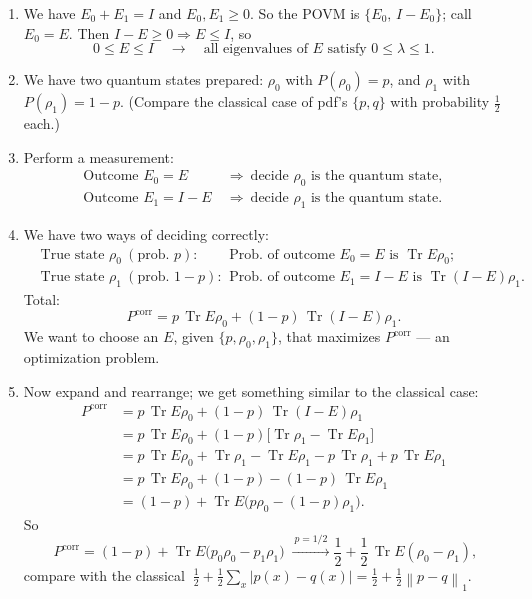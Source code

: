 \documentclass[11pt]{article}
\newcommand{\Tr}{\operatorname{Tr}}
\newcommand{\onenorm}[1]{\left\lVert #1 \right\rVert_{1}}
\begin{document}
\begin{enumerate}[label=\textbf{\arabic*.}, leftmargin=*]
\item We have $E_0+E_1=I$ and $E_0,E_1\ge 0$. So the POVM is $\{E_0,\,I-E_0\}$;
call $E_0=E$. Then $I-E\ge 0 \Rightarrow E\le I$, so
\[
0 \le E \le I \quad\longrightarrow\quad
\text{all eigenvalues of } E \text{ satisfy } 0\le\lambda\le 1.
\]

\item We have two quantum states prepared: $\rho_0$ with $P(\rho_0)=p$, and
$\rho_1$ with $P(\rho_1)=1-p$. (Compare the classical case of pdf's $\{p,q\}$
with probability $\tfrac12$ each.)

\item Perform a measurement:
\[
\begin{aligned}
\text{Outcome } E_0=E \ &\Rightarrow\ \text{decide } \rho_0 \text{ is the quantum state},\\
\text{Outcome } E_1=I-E \ &\Rightarrow\ \text{decide } \rho_1 \text{ is the quantum state}.
\end{aligned}
\]

\item We have two ways of deciding correctly:
\[
\begin{aligned}
&\text{True state } \rho_0 \ (\text{prob. } p):
&&\text{Prob.\ of outcome } E_0=E \text{ is } \Tr E\rho_0;\\
&\text{True state } \rho_1 \ (\text{prob. } 1-p):
&&\text{Prob.\ of outcome } E_1=I-E \text{ is } \Tr(I-E)\rho_1.
\end{aligned}
\]
Total:
\[
\boxed{\; P^{\mathrm{corr}} = p\,\Tr E\rho_0 + (1-p)\,\Tr(I-E)\rho_1. \;}
\]
We want to choose an $E$, given $\{p,\rho_0,\rho_1\}$, that maximizes
$P^{\mathrm{corr}}$ --- an optimization problem.

\item Now expand and rearrange; we get something similar to the classical case:
\begin{align*}
P^{\mathrm{corr}}
&= p\,\Tr E\rho_0 + (1-p)\,\Tr(I-E)\rho_1\\
&= p\,\Tr E\rho_0 + (1-p)\big[\Tr\rho_1 - \Tr E\rho_1\big]\\
&= p\,\Tr E\rho_0 + \Tr\rho_1 - \Tr E\rho_1 - p\,\Tr\rho_1 + p\,\Tr E\rho_1\\
&= p\,\Tr E\rho_0 + (1-p) - (1-p)\,\Tr E\rho_1\\
&= (1-p) + \Tr E\big(p\rho_0 - (1-p)\rho_1\big).
\end{align*}
So
\[
\boxed{\; P^{\mathrm{corr}} = (1-p) + \Tr E\big(p_0\rho_0 - p_1\rho_1\big) \;}
\xrightarrow{\ p=1/2\ }
\frac12 + \frac12\,\Tr E(\rho_0-\rho_1),
\]
compare with the classical
$\ \tfrac12 + \tfrac12\sum_x|p(x)-q(x)| = \tfrac12 + \tfrac12\onenorm{p-q}$.
\end{enumerate}
\end{document}
